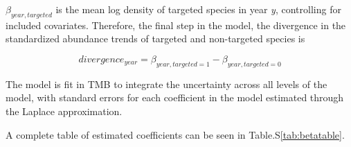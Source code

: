 \documentclass[]{article}
\begin{document}
\(\beta_{year,targeted}\) is the mean log density of targeted species in year \emph{y}, controlling for included covariates. Therefore, the final step in the model, the divergence in the standardized abundance trends of targeted and non-targeted species is

\begin{equation}
divergence_{year} =  \beta_{year,targeted = 1} - \beta_{year,targeted = 0}
  \label{eq:mpaeffect}
\end{equation}

The model is fit in TMB to integrate the uncertainty across all levels of the model, with standard errors for each coefficient in the model estimated through the Laplace approximation.

A complete table of estimated coefficients can be seen in Table.S\ref{tab:betatable}.
\end{document}
